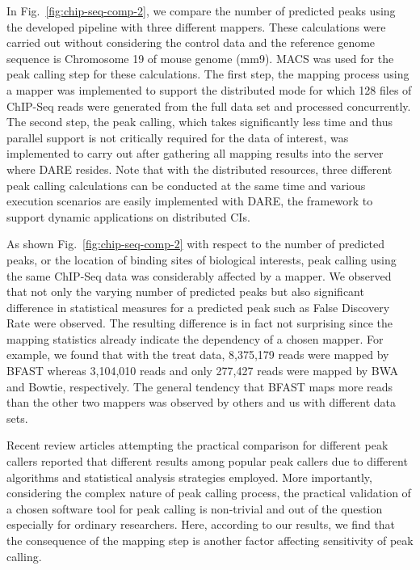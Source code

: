 \documentclass{cpeauth}
\begin{document}
In Fig.~\ref{fig:chip-seq-comp-2}, we compare the number of predicted peaks using the developed pipeline with three different mappers.  These calculations were carried out without considering the control data and the reference genome sequence is Chromosome 19 of mouse genome (mm9).  MACS was used for the peak calling step for these calculations.  The first step, the mapping process using a mapper was implemented to support the distributed mode for which 128 files of ChIP-Seq reads were generated from the full data set and processed concurrently. The second step, the peak calling, which takes significantly less time and thus parallel support is not critically required for the data of interest, was implemented to carry out after gathering all mapping results into the server where DARE resides.  Note that with the distributed resources, three different peak calling calculations can be conducted at the same time and various execution scenarios are easily implemented with DARE, the framework to support dynamic applications on distributed CIs.  

As shown Fig.~\ref{fig:chip-seq-comp-2} with respect to the number of predicted peaks, or the location of binding sites of biological interests,  peak calling using the same ChIP-Seq data was considerably affected by a mapper.  We observed that not only the varying number of predicted peaks but also significant difference in statistical measures for a predicted peak such as False Discovery Rate were observed.  The resulting difference is in fact not surprising since the mapping statistics already indicate the dependency of a chosen mapper.   For example, we found that with the treat data, 8,375,179 reads were mapped by BFAST whereas 3,104,010 reads and only 277,427 reads were mapped by BWA and Bowtie, respectively.  The general tendency that BFAST maps more reads than the other two mappers was observed by others and us with different data sets\cite{bfast2009,mapping-survey}.  

Recent review articles attempting the practical comparison for different peak callers reported that different results among popular peak callers due to different algorithms and statistical analysis strategies employed\cite{wilbanks, laajala}.  More importantly, considering the complex nature of peak calling process, the practical validation of a chosen software tool for peak calling is non-trivial and out of the question especially for ordinary researchers.  Here, according to our results, we find that the consequence of the mapping step is another factor affecting sensitivity of peak calling.
\end{document}
